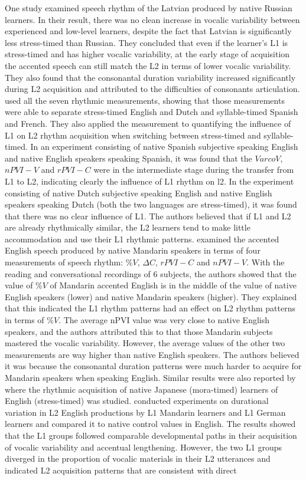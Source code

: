One study \citep{stockmal2005measures} examined speech rhythm of the Latvian produced by native Russian learners. In their result, there was no clean increase in vocalic variability between experienced and low-level learners, despite the fact that Latvian is significantly less stress-timed than Russian. They concluded that even if the learner's L1 is stress-timed and has higher vocalic variability, at the early stage of acquisition the accented speech can still match the L2 in terms of lower vocalic variability. They also found that the consonantal duration variability increased significantly during L2 acquisition and attributed to the difficulties of consonants articulation. \cite{white2007calibrating} used all the seven rhythmic measurements, showing that those measurements were able to separate stress-timed English and Dutch and syllable-timed Spanish and French. They also applied the measurement to quantifying the influence of L1 on L2 rhythm acquisition when switching between stress-timed and syllable-timed. In an experiment consisting of native Spanish subjective speaking English and native English speakers speaking Spanish, it was found that the $VarcoV$, $nPVI-V$ and $rPVI-C$ were in the intermediate stage during the transfer from L1 to L2, indicating clearly the influence of L1 rhythm on l2. In the experiment consisting of native Dutch subjective speaking English and native English speakers speaking Dutch (both the two languages are stress-timed), it was found that there was no clear influence of L1. The authors believed that if L1 and L2 are already rhythmically similar, the L2 learners tend to make little accommodation and use their L1 rhythmic patterns. \cite{lin2008interlanguage} examined the accented English speech produced by native Mandarin speakers in terms of four measurements of speech rhythm: $\%V$, $\Delta C$, $rPVI-C$ and $nPVI-V$. With the reading and conversational recordings of 6 subjects, the authors showed that the value of $\%V$ of Mandarin accented English is in the middle of the value of native English speakers (lower) and native Mandarin speakers (higher). They explained that this indicated the L1 rhythm patterns had an effect on L2 rhythm patterns in terms of $\%V$. The average nPVI value was very close to native English speakers, and the authors attributed this to that those Mandarin subjects mastered the vocalic variability. However, the average values of the other two measurements are way higher than native English speakers. The authors believed it was because the consonantal duration patterns were much harder to acquire for Mandarin speakers when speaking English. Similar results were also reported by \cite{kawase2016influence} where the rhythmic acquisition of native Japanese (mora-timed) learners of English (stress-timed) was studied. \cite{li2014l2} conducted experiments on durational variation in L2 English productions by L1 Mandarin learners and L1 German learners and compared it to native control values in English. The results showed that the L1 groups followed comparable developmental paths in their acquisition of vocalic variability and accentual lengthening. However, the two L1 groups diverged in the proportion of vocalic materials in their L2 utterances and indicated L2 acquisition patterns that are consistent with direct 